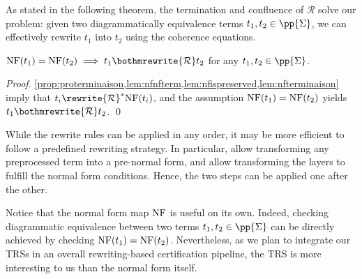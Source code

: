 As stated in the following theorem, the termination and confluence of $\mathcal{R}$ solve our problem: given two diagrammatically equivalence terms $t_1,t_2\in\pp{\Sigma}$, we can effectively rewrite $t_1$ into $t_2$ using the coherence equations.

\begin{theorem}
    $\textup{NF}(t_1)=\textup{NF}(t_2)\implies t_1\bothmrewrite{\mathcal{R}} t_2$ for any $t_1,t_2\in\pp{\Sigma}$.
\end{theorem}
\begin{proof}
    \cref{prop:proterminaison,lem:nfnfterm,lem:nfispreserved,lem:nfterminaison} imply that $t_i\rewrite{\mathcal{R}}^*\textup{NF}(t_i)$, and the assumption $\textup{NF}(t_1)=\textup{NF}(t_2)$ yields $t_1\bothmrewrite{\mathcal{R}} t_2$.
    \qed
\end{proof}

While the rewrite rules can be applied in any order, it may be more efficient to follow a predefined rewriting strategy. In particular,  allow transforming any preprocessed term into a pre-normal form, and  allow transforming the layers to fulfill the normal form conditions. Hence, the two steps can be applied one after the other.

Notice that the normal form map $\textup{NF}$ is useful on its own.
Indeed, checking diagrammatic equivalence between two terms $t_1,t_2\in\pp{\Sigma}$ can be directly achieved by checking $\textup{NF}(t_1)=\textup{NF}(t_2)$.
Nevertheless, as we plan to integrate our TRSs in an overall rewriting-based certification pipeline, the TRS is more interesting to us than the normal form itself.